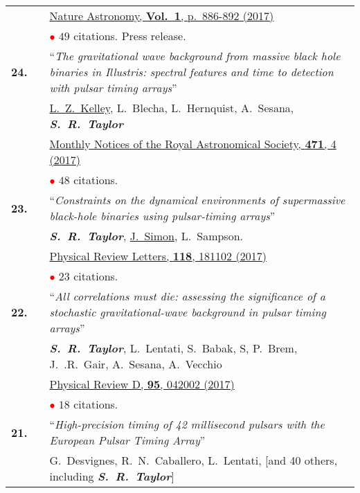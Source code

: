 \documentclass[11pt,letterpaper,sans]{moderncv}
\begin{document}
{\begin{longtable}{rp{0.3cm}p{15.8cm}}
&& \href{https://www.nature.com/articles/s41550-017-0299-6}{{\color{color1} Nature Astronomy, \textbf{Vol.~1}, p.~886-892 (2017)}} \\
&& \textcolor{red}{$\bullet$} $49$ citations. Press release. \vspace{0.09cm}\\
\textbf{24.} & & ``\textit{The gravitational wave background from massive black hole binaries in Illustris: spectral features and time to detection with pulsar timing arrays}'' \\ 
&& \underline{L.~Z.~Kelley}, L.~Blecha, L.~Hernquist, A.~Sesana, \textit{\textbf{S.~R.~Taylor}} \\ 
&& \href{https://academic.oup.com/mnras/article/471/4/4508/3899130/The-gravitational-wave-background-from-massive}{{\color{color1} Monthly Notices of the Royal Astronomical Society, \textbf{471}, 4 (2017)}} \\
&& \textcolor{red}{$\bullet$} $48$ citations. \vspace{0.09cm}\\
\textbf{23.} & & ``\textit{Constraints on the dynamical environments of supermassive black-hole binaries using pulsar-timing arrays}'' \\ 
&& \textit{\textbf{S.~R.~Taylor}}, \underline{J.~Simon}, L.~Sampson. \\
&& \href{https://journals.aps.org/prl/abstract/10.1103/PhysRevLett.118.181102}{{\color{color1} Physical Review Letters, \textbf{118}, 181102 (2017)}} \\
&& \textcolor{red}{$\bullet$} $23$ citations. \vspace{0.09cm}\\
\textbf{22.} & & ``\textit{All correlations must die: assessing the significance of a stochastic gravitational-wave background in pulsar timing arrays}'' \\ 
&& \textit{\textbf{S.~R.~Taylor}},  L.~Lentati, S.~Babak, S, P.~Brem, J.~.R.~Gair, A.~Sesana, A.~Vecchio \\ 
&&  \href{https://journals.aps.org/prd/abstract/10.1103/PhysRevD.95.042002}{{\color{color1} Physical Review D, \textbf{95}, 042002 (2017)}} \\
&& \textcolor{red}{$\bullet$} $18$ citations. \vspace{0.09cm}\\
\textbf{21.} & & ``\textit{High-precision timing of 42 millisecond pulsars with the European Pulsar Timing Array}'' \\ 
&& G.~Desvignes, R.~N.~Caballero, L.~Lentati, [and 40 others, including \textit{\textbf{S.~R.~Taylor}}] \\ 

\end{longtable}}
\end{document}
